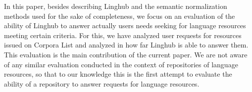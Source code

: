 \documentclass[smallextended]{svjour3}       %
\begin{document}
In this paper, besides describing Linghub and the semantic normalization
methods used for the sake of completeness, we focus on an evaluation of the
ability of Linghub to answer actually users needs seeking for language
resources meeting certain criteria. For this, we have analyzed user requests
for resources issued on Corpora List and analyzed in how far Linghub is
able to answer them. This evaluation is the main contribution of the current
paper. We are not aware of any similar evaluation conducted in the context of
repositories of language resources, so that to our knowledge this is the first
attempt to evaluate the ability of a repository to answer requests for language
resources.

%
\end{document}
